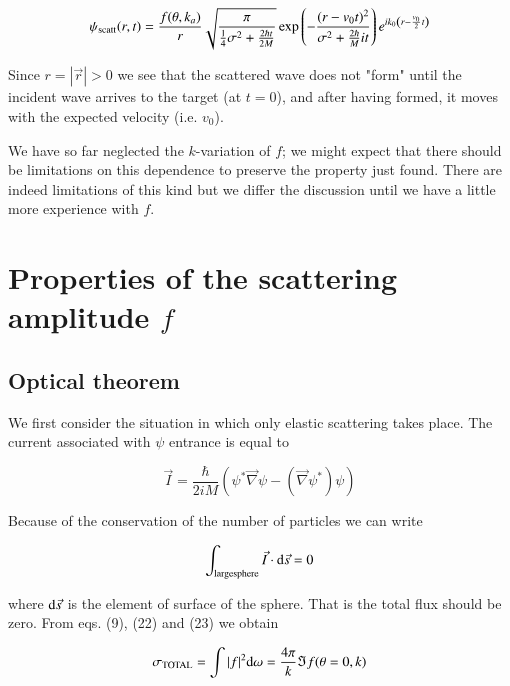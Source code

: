 \documentclass[a4paper,14pt]{book}
\begin{document}
\begin{equation}
\psi_{\rm scatt}(r,t) = \frac{f(\theta, k_a)}{r} \sqrt{\frac{\pi}{\frac{1}{4} \sigma^2 + \frac{2 \hbar t}{2M}}} \exp\left(- \frac{(r-v_0 t)^2}{\sigma^2 + \frac{2 \hbar}{M} i t}\right) e^{i k_0 \left( r- \frac{v_0}{2} t \right)}
\end{equation}

\noindent Since $r = |\vec{r}| > 0$ we see that the scattered wave does not "form" until the incident wave arrives to the target (at $t=0$), and after having formed, it moves with the expected velocity (i.e. $v_0$).

We have so far neglected the $k$-variation of $f$; we might expect that there should be limitations on this dependence to preserve the property just found. There are indeed limitations of this kind but we differ the discussion until we have a little more experience with $f$.


\section{Properties of the scattering amplitude $f$}

\subsection{Optical theorem}

We first consider the situation in which only elastic scattering takes place. The current associated with $\psi$ entrance is equal to

\begin{equation}
\vec{I} = \frac{\hbar}{2iM} \left( \psi^* \vec{\nabla} \psi - \left( \vec{\nabla} \psi^* \right) \psi \right)
\end{equation}

\noindent Because of the conservation of the number of particles we can write

\begin{equation}
\int_{\rm large sphere} \vec{I} \cdot {\rm d}\vec{s} = 0
\end{equation}

\noindent where ${\rm d}\vec{s}$ is the element of surface of the sphere. That is the total flux should be zero. From eqs. (9), (22) and (23) we obtain

\begin{equation}
\sigma_{\rm TOTAL} = \int |f|^2 {\rm d}\omega = \frac{4\pi}{k} \Im f(\theta=0,k)
\end{equation}
\end{document}
